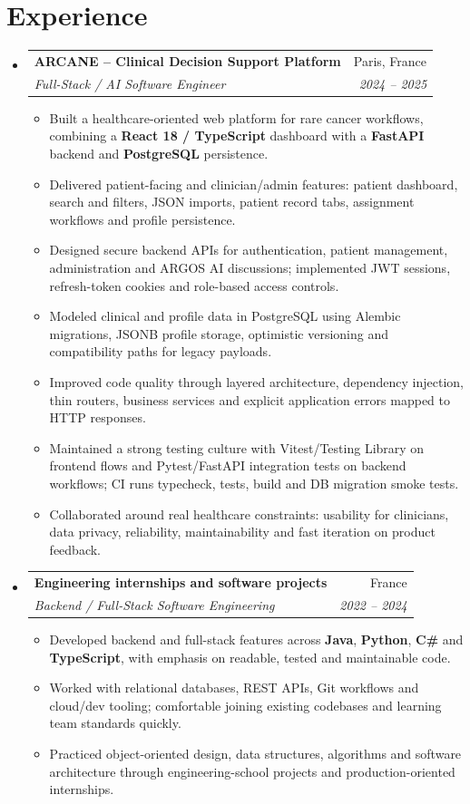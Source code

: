 \documentclass[letterpaper,11pt]{article}
\makeatletter
\newcommand{\resumeItem}[1]{\item\small{#1 \vspace{-2pt}}}
\newcommand{\resumeSubheading}[4]{
  \vspace{-2pt}\item
    \begin{tabular*}{0.97\textwidth}[t]{l@{\extracolsep{\fill}}r}
      \textbf{#1} & #2 \\
      \textit{\small#3} & \textit{\small #4} \\
    \end{tabular*}\vspace{-7pt}
}
\newcommand{\resumeSubHeadingListStart}{\begin{itemize}[leftmargin=0.15in, label={}]}
\newcommand{\resumeSubHeadingListEnd}{\end{itemize}}
\newcommand{\resumeItemListStart}{\begin{itemize}[leftmargin=0.18in]}
\newcommand{\resumeItemListEnd}{\end{itemize}\vspace{-5pt}}
\makeatother
\begin{document}
\section{Experience}
\resumeSubHeadingListStart
  \resumeSubheading
    {ARCANE -- Clinical Decision Support Platform}{Paris, France}
    {Full-Stack / AI Software Engineer}{2024 -- 2025}
    \resumeItemListStart
      \resumeItem{Built a healthcare-oriented web platform for rare cancer workflows, combining a \textbf{React 18 / TypeScript} dashboard with a \textbf{FastAPI} backend and \textbf{PostgreSQL} persistence.}
      \resumeItem{Delivered patient-facing and clinician/admin features: patient dashboard, search and filters, JSON imports, patient record tabs, assignment workflows and profile persistence.}
      \resumeItem{Designed secure backend APIs for authentication, patient management, administration and ARGOS AI discussions; implemented JWT sessions, refresh-token cookies and role-based access controls.}
      \resumeItem{Modeled clinical and profile data in PostgreSQL using Alembic migrations, JSONB profile storage, optimistic versioning and compatibility paths for legacy payloads.}
      \resumeItem{Improved code quality through layered architecture, dependency injection, thin routers, business services and explicit application errors mapped to HTTP responses.}
      \resumeItem{Maintained a strong testing culture with Vitest/Testing Library on frontend flows and Pytest/FastAPI integration tests on backend workflows; CI runs typecheck, tests, build and DB migration smoke tests.}
      \resumeItem{Collaborated around real healthcare constraints: usability for clinicians, data privacy, reliability, maintainability and fast iteration on product feedback.}
    \resumeItemListEnd

  \resumeSubheading
    {Engineering internships and software projects}{France}
    {Backend / Full-Stack Software Engineering}{2022 -- 2024}
    \resumeItemListStart
      \resumeItem{Developed backend and full-stack features across \textbf{Java}, \textbf{Python}, \textbf{C\#} and \textbf{TypeScript}, with emphasis on readable, tested and maintainable code.}
      \resumeItem{Worked with relational databases, REST APIs, Git workflows and cloud/dev tooling; comfortable joining existing codebases and learning team standards quickly.}
      \resumeItem{Practiced object-oriented design, data structures, algorithms and software architecture through engineering-school projects and production-oriented internships.}
    \resumeItemListEnd
\resumeSubHeadingListEnd
\end{document}
